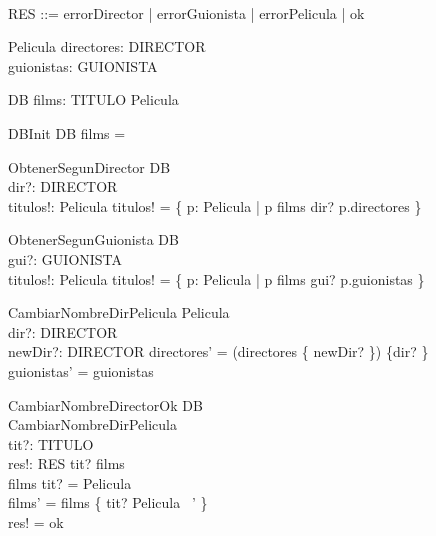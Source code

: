 \documentclass[a4paper, 12pt] {article}
\begin{document}
\begin{zed}
   \\
  RES ::= errorDirector | errorGuionista | errorPelicula | ok
\end{zed}

\begin{schema}{Pelicula}
directores: \power DIRECTOR \\
guionistas: \power GUIONISTA
\end{schema}

\begin{schema}{DB}
  films: TITULO \pfun Pelicula
\end{schema}

\begin{schema}{DBInit}
  DB
\where
  films = \emptyset
\end{schema}

\begin{schema}{ObtenerSegunDirector}
\Xi DB \\
dir?: DIRECTOR \\
titulos!: \power Pelicula
\where
titulos! = \{ p: Pelicula | p \in \ran films \land dir? \in p.directores \}
\end{schema}

\begin{schema}{ObtenerSegunGuionista}
\Xi DB \\
gui?: GUIONISTA \\
titulos!: \power Pelicula
\where
titulos! = \{ p: Pelicula | p \in \ran films \land gui? \in p.guionistas \}
\end{schema}

\begin{schema}{CambiarNombreDirPelicula}
\Delta Pelicula \\
dir?: DIRECTOR \\
newDir?: DIRECTOR
\where
directores' = (directores \cup \{ newDir? \}) \setminus \{dir? \} \\
guionistas' = guionistas
\end{schema}

\begin{schema}{CambiarNombreDirectorOk}
\Delta DB \\
CambiarNombreDirPelicula \\
tit?: TITULO \\
res!: RES
\where
tit? \in \dom films \\
films \: tit? = \theta Pelicula \\
films' = films \oplus \{ tit? \mapsto \theta Pelicula \ ' \} \\
res! = ok
\end{schema}
\end{document}
